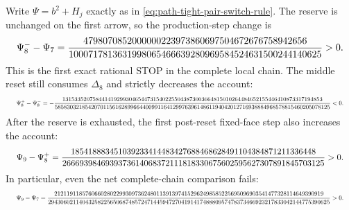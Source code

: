 \begin{proposition}
Write $\Psi=b^2+H_j$ exactly as in
\cref{eq:path-tight-pair-switch-rule}.  The reserve is unchanged on the first
arrow, so the production-step change is
\begin{equation}
 \resizebox{0.98\linewidth}{!}{$
 \displaystyle
 \Psi_8^- - \Psi_7
 =\frac{
 4798070852000000223973860697504672676758942656}
 {1000717813631998065466639280969584524631500244140625}>0.
 $}
 \label{eq:path-tight-pair-production-stop}
\end{equation}
This is the first exact rational STOP in the complete local chain.  The
middle reset still consumes $\Delta_8$ and strictly decreases the account:
\begin{equation}
 \resizebox{0.98\linewidth}{!}{$
 \displaystyle
 \Psi_8^+ - \Psi_8^-
 =-\frac{
 13153352075844141929930465447315402255043873003664815010264484652155446410873317194853}
 {5858303218542070115616289966440099116412997639614861194042012716938884968578815460205078125}<0.
 $}
 \label{eq:path-tight-pair-local-chain-reset-go}
\end{equation}
After the reserve is exhausted, the first post-reset fixed-face step also
increases the account:
\begin{equation}
 \resizebox{0.98\linewidth}{!}{$
 \displaystyle
 \Psi_9-\Psi_8^+
 =\frac{
 185418883451039233414483427688468628491104384871211336448}
 {2666939846939373614068372111818330675602595627307891845703125}>0.
 $}
 \label{eq:path-tight-pair-followup-stop}
\end{equation}
In particular, even the net complete-chain comparison fails:
\begin{equation}
 \resizebox{0.98\linewidth}{!}{$
 \displaystyle
 \Psi_9-\Psi_7
 =\frac{
 212119118576066028022993097362480113913974152962498585225695096903541477328114649390919}
 {2943060211404325822565068748572471445947270419141748880957478373466923217833042144775390625}>0.
 $}
 \label{eq:path-tight-pair-local-chain-net-stop}
\end{equation}


\end{proposition}
